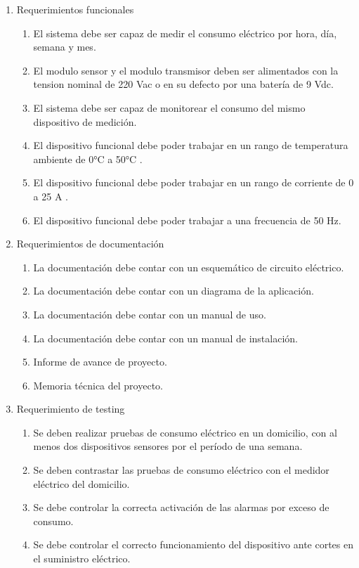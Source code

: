 \documentclass[
11pt, %
]{charter}
\begin{document}
\begin{enumerate}
	\item Requerimientos funcionales
		\begin{enumerate}
			\item El sistema debe ser capaz de medir el consumo eléctrico por hora, día, semana y mes.
			\item El modulo sensor y el modulo transmisor deben ser alimentados con la tension nominal de 220 Vac o en su defecto por una batería de 9 Vdc.
			\item El sistema debe ser capaz de monitorear el consumo del mismo dispositivo de medición.
			\item El dispositivo funcional debe poder trabajar en un rango de temperatura ambiente de 0°C a 50°C .
			\item El dispositivo funcional debe poder trabajar en un rango de corriente de 0 a 25 A .
			\item El dispositivo funcional debe poder trabajar a una frecuencia de 50 Hz.
			
		\end{enumerate}
		
	\item Requerimientos de documentación
		\begin{enumerate}
			\item La documentación debe contar con un esquemático de circuito eléctrico.
			\item La documentación debe contar con  un diagrama de la aplicación.
			\item La documentación debe contar con un manual de uso.
			\item La documentación debe contar con un manual de instalación.
			\item Informe de avance de proyecto.
			\item Memoria técnica del proyecto.
		\end{enumerate}
		
	\item Requerimiento de testing
		\begin{enumerate}
			\item Se deben realizar pruebas de consumo eléctrico en un domicilio, con al menos dos dispositivos sensores por el período de una semana.
			\item Se deben contrastar las pruebas de consumo eléctrico con el medidor eléctrico del domicilio.
			\item Se debe controlar la correcta activación de las alarmas por exceso de consumo.
			\item Se debe controlar el correcto funcionamiento del dispositivo ante cortes en el suministro eléctrico.
								

\end{enumerate}
\end{enumerate}
\end{document}

